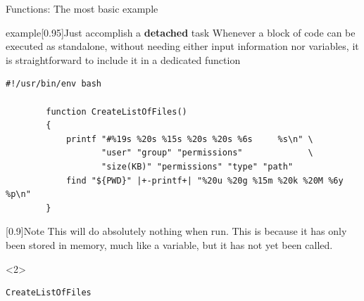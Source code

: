 \begin{frame}[fragile]{Functions: The most basic example}
    \vspace{-3mm}
    \begin{varblock}{example}[0.95\textwidth]{Just accomplish a \textbf{detached} task}
        Whenever a block of code can be executed as standalone, without needing either input information nor variables, it is straightforward to include it in a dedicated function
    \end{varblock}
    \begin{lstlisting}[style=MyBash, xrightmargin=1mm, xleftmargin=1mm]
        #!/usr/bin/env bash

        function CreateListOfFiles()
        {
            printf "#%19s %20s %15s %20s %20s %6s     %s\n" \
                   "user" "group" "permissions"             \
                   "size(KB)" "permissions" "type" "path"
            find "${PWD}" |+-printf+| "%20u %20g %15m %20k %20M %6y     %p\n"
        }
    \end{lstlisting}
    \begin{varblock}{}[0.9\textwidth]{Note}
        This will do absolutely nothing when run. This is because it has only been stored in memory, much like a variable, but it has not yet been called.
    \end{varblock}
    \begin{uncoverenv}<2>
        \begin{lstlisting}[style=MyBash, firstnumber=9, xrightmargin=1mm, xleftmargin=1mm]
            CreateListOfFiles
        \end{lstlisting}
    \end{uncoverenv}
\end{frame}
